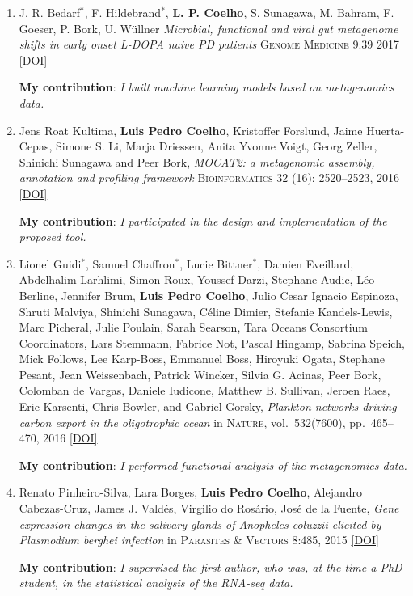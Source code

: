 \documentclass{article}
\newcommand\showdoi[1]{%
    \href{http://dx.doi.org/#1}{[DOI]}%
}
\newcommand\pubname[1]{\textsc{#1}}
\newcommand\contribution[1]{\relax\hfill\break\textbf{My contribution}: \textit{#1}}
\newcommand\costar{${}^{*}$}
\begin{document}
\begin{enumerate}[resume]
\item J. R. Bedarf\costar, F. Hildebrand\costar, \textbf{L. P. Coelho}, S.
Sunagawa, M. Bahram, F. Goeser, P. Bork, U. Wüllner \emph{Microbial, functional
and viral gut metagenome shifts in early onset L-DOPA naive PD patients}
\pubname{Genome Medicine} 9:39 2017 \showdoi{10.1186/s13073-017-0428-y}
\contribution{I built machine learning models based on metagenomics data.}

\item Jens Roat Kultima, \textbf{Luis Pedro Coelho}, Kristoffer Forslund, Jaime
Huerta-Cepas, Simone S. Li, Marja Driessen, Anita Yvonne Voigt, Georg Zeller,
Shinichi Sunagawa and Peer Bork, \emph{MOCAT2: a metagenomic assembly,
annotation and profiling framework} \pubname{Bioinformatics} 32 (16):
2520--2523, 2016 \showdoi{10.1093/bioinformatics/btw183}
\contribution{I participated in the design and implementation of the proposed tool.}

\item Lionel Guidi\costar, Samuel Chaffron\costar, Lucie Bittner\costar,
Damien Eveillard, Abdelhalim Larhlimi, Simon Roux, Youssef Darzi, Stephane
Audic, Léo Berline, Jennifer Brum, \textbf{Luis Pedro Coelho}, Julio Cesar
Ignacio Espinoza, Shruti Malviya, Shinichi Sunagawa, Céline Dimier, Stefanie
Kandels-Lewis, Marc Picheral, Julie Poulain, Sarah Searson, Tara Oceans
Consortium Coordinators, Lars Stemmann, Fabrice Not, Pascal Hingamp, Sabrina
Speich, Mick Follows, Lee Karp-Boss, Emmanuel Boss, Hiroyuki Ogata, Stephane
Pesant, Jean Weissenbach, Patrick Wincker, Silvia G. Acinas, Peer Bork,
Colomban de Vargas, Daniele Iudicone, Matthew B. Sullivan, Jeroen Raes, Eric
Karsenti, Chris Bowler, and Gabriel Gorsky, \emph{Plankton networks driving
carbon export in the oligotrophic ocean} in \pubname{Nature}, vol.\ 532(7600),
pp.\ 465--470, 2016 \showdoi{10.1038/nature16942}
\contribution{I performed functional analysis of the metagenomics data.}

\item Renato Pinheiro-Silva, Lara Borges, \textbf{Luis Pedro Coelho}, Alejandro
Cabezas-Cruz, James J. Valdés, Virgilio do Rosário, José de la Fuente,
\emph{Gene expression changes in the salivary glands of Anopheles coluzzii
elicited by Plasmodium berghei infection} in \pubname{Parasites \& Vectors}
8:485, 2015 \showdoi{10.1186/s13071-015-1079-8}
\contribution{I supervised the first-author, who was, at the time a PhD
student, in the statistical analysis of the RNA-seq data.}


\end{enumerate}
\end{document}
